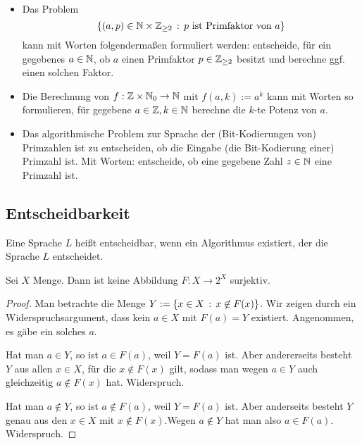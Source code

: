 \begin{bsp}\ 
	\begin{itemize} 
		\item Das Problem
		\[
		\left\{  (a,p) \in \mathbb{N} \times \mathbb{Z}_{\ge 2}  \,:\, p \ \text{ist Primfaktor von} \ a \right\}
		\]
		kann mit Worten folgendermaßen formuliert werden: entscheide, für ein gegebenes $a \in \mathbb{N}$, ob $a$ einen Primfaktor $p \in \mathbb{Z}_{\ge 2}$ besitzt und berechne ggf. einen solchen Faktor. 
		\item Die Berechnung von $f : \mathbb{Z} \times \mathbb{N}_0 \to \mathbb{N}$ mit $f(a,k):= a^k$ kann mit Worten so formulieren, für gegebene $a \in \mathbb{Z},k \in \mathbb{N}$ berechne die $k$-te Potenz von $a$. 
		\item Das algorithmische  Problem zur Sprache der (Bit-Kodierungen von) Primzahlen ist zu entscheiden, ob die Eingabe (die Bit-Kodierung einer) Primzahl ist. Mit Worten: entscheide, ob eine gegebene Zahl $z \in \mathbb{N}$ eine Primzahl ist. 
	\end{itemize} 
\end{bsp} 

\subsection{Entscheidbarkeit}

\begin{defn}
	Eine Sprache $L$ heißt entscheidbar, wenn ein Algorithmus existiert, der die Sprache $L$ entscheidet. 
\end{defn} 

\begin{lem} \label{lem:X:2^X}
	Sei $X$ Menge. Dann ist keine Abbildung $F : X \to 2^X$ surjektiv. 
\end{lem}
\begin{proof}
	Man betrachte die Menge $Y := \left\{ x \in X \,:\, x \not\in F(x) \right\}$. Wir zeigen durch ein Widerspruchsargument, dass kein $a \in X$ mit $F(a) =Y$ existiert. Angenommen, es gäbe ein solches $a$. 
	
	Hat man $a \in Y$, so ist $a \in F(a)$, weil $Y=F(a)$ ist. Aber andererseits besteht $Y$ aus allen $x \in X$, für die $x \not\in F(x)$ gilt, sodass man wegen $a \in Y$ auch gleichzeitig $a \not\in F(x)$ hat. Widerspruch. 
	
	Hat man $a \not\in Y$, so ist $a \not\in F(a)$, weil $Y=F(a)$ ist. Aber anderseits besteht $Y$ genau aus den $x \in X$ mit $x \not\in F(x)$.Wegen $a \not\in Y$ hat man also $a \in F(a)$. Widerspruch. 
\end{proof} 

